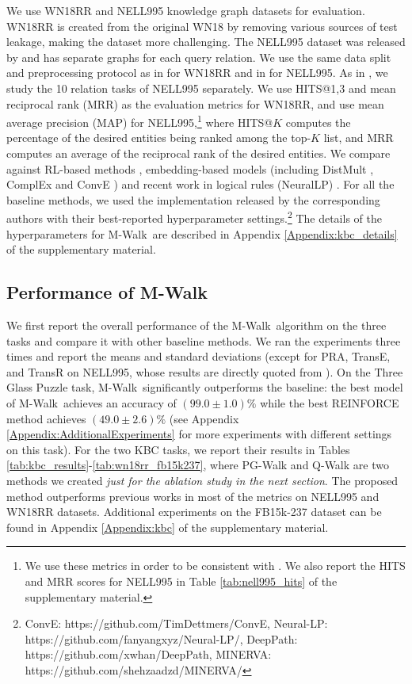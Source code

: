 \documentclass{article}
\newcommand{\modelname}{M-Walk}
\begin{document}
	We use WN18RR and NELL995 knowledge graph datasets for evaluation. WN18RR \cite{dettmers2018conve} is created from the original WN18 \cite{bordes2013translating} by removing various sources of test leakage, making the dataset more challenging. The NELL995 dataset was released by \cite{DeepPath} and has separate graphs for each query relation.
	We use the same data split and preprocessing protocol as in \cite{dettmers2018conve} for WN18RR and in \cite{DeepPath, GoforaWalk} for NELL995. 
	As in \cite{DeepPath, GoforaWalk}, we study the 10 relation tasks of NELL995 separately.
	We use HITS@1,3 and mean reciprocal rank (MRR) as the evaluation metrics for WN18RR, and use mean average precision (MAP) for NELL995,\footnote{We use these metrics in order to be consistent with \cite{DeepPath,GoforaWalk}. We also report the HITS and MRR scores for NELL995 in Table \ref{tab:nell995_hits} of the supplementary material.} where HITS@$K$ computes the percentage of the desired entities being ranked among the top-$K$ list, and MRR computes an average of the reciprocal rank of the desired entities. 
	We compare against RL-based methods \cite{DeepPath, GoforaWalk}, embedding-based models (including DistMult \cite{DBLP:journals/corr/YangYHGD14a}, ComplEx \cite{trouillon2016complex} and ConvE \cite{dettmers2018conve}) and recent work in logical rules (NeuralLP) \cite{yang2017differentiable}. 
	For all the baseline methods, we used the implementation released by the corresponding authors with their best-reported hyperparameter settings.\footnote{ConvE: https://github.com/TimDettmers/ConvE, Neural-LP: https://github.com/fanyangxyz/Neural-LP/, DeepPath: https://github.com/xwhan/DeepPath, MINERVA: https://github.com/shehzaadzd/MINERVA/} The details of the hyperparameters for \modelname~are described in Appendix \ref{Appendix:kbc_details} of the supplementary material.
	
	
\subsection{Performance of \modelname}


	We first report the overall performance of the \modelname~algorithm on the three tasks and compare it with other baseline methods. We ran the experiments three times and report the means and standard deviations (except for PRA, TransE, and TransR on NELL995, whose results are directly quoted from \cite{DeepPath}). On the Three Glass Puzzle task, \modelname~significantly outperforms the baseline: the best model of \modelname~achieves an accuracy of $(99.0 \pm 1.0)\%$ while the best REINFORCE method achieves $(49.0 \pm 2.6)\%$ (see Appendix \ref{Appendix:AdditionalExperiments} for more experiments with different settings on this task). For the two KBC tasks, we report their results in Tables \ref{tab:kbc_results}-\ref{tab:wn18rr_fb15k237}, where PG-Walk and Q-Walk are two methods we created \emph{just for the ablation study in the next section}. The proposed method outperforms previous works in most of the metrics on NELL995 and WN18RR datasets. Additional experiments on the FB15k-237 dataset can be found in Appendix \ref{Appendix:kbc} of the supplementary material.
    	
\end{document}
